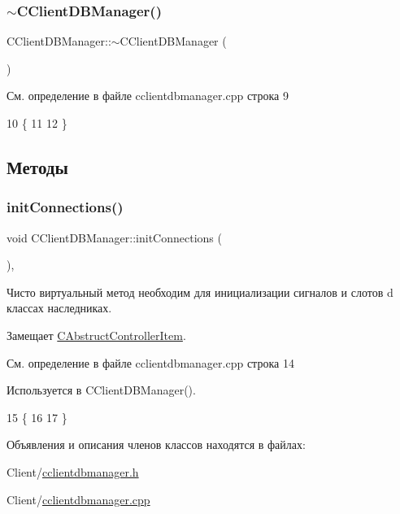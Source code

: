 \subsubsection{\texorpdfstring{$\sim$\+C\+Client\+D\+B\+Manager()}{~CClientDBManager()}}
{\footnotesize\ttfamily C\+Client\+D\+B\+Manager\+::$\sim$\+C\+Client\+D\+B\+Manager (\begin{DoxyParamCaption}{ }\end{DoxyParamCaption})\hspace{0.3cm}{\ttfamily [virtual]}}



См. определение в файле cclientdbmanager.\+cpp строка 9


\begin{DoxyCode}
10 \{
11 
12 \}
\end{DoxyCode}


\subsection{Методы}
\hypertarget{class_c_client_d_b_manager_a85d962d6f61d8f9480b6bc9a7f121204}{}\label{class_c_client_d_b_manager_a85d962d6f61d8f9480b6bc9a7f121204} 
\subsubsection{\texorpdfstring{init\+Connections()}{initConnections()}}
{\footnotesize\ttfamily void C\+Client\+D\+B\+Manager\+::init\+Connections (\begin{DoxyParamCaption}{ }\end{DoxyParamCaption})\hspace{0.3cm}{\ttfamily [protected]}, {\ttfamily [virtual]}}



Чисто виртуальный метод необходим для инициализации сигналов и слотов d классах наследниках. 



Замещает \hyperlink{class_c_abstruct_controller_item_a27c6889230a86cb0782e6d7596b883c1}{C\+Abstruct\+Controller\+Item}.



См. определение в файле cclientdbmanager.\+cpp строка 14



Используется в C\+Client\+D\+B\+Manager().


\begin{DoxyCode}
15 \{
16 
17 \}
\end{DoxyCode}


Объявления и описания членов классов находятся в файлах\+:\begin{DoxyCompactItemize}
\item 
Client/\hyperlink{cclientdbmanager_8h}{cclientdbmanager.\+h}\item 
Client/\hyperlink{cclientdbmanager_8cpp}{cclientdbmanager.\+cpp}\end{DoxyCompactItemize}
